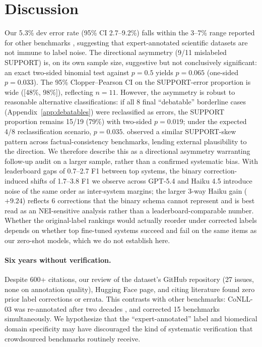 \documentclass[11pt]{article}
\begin{document}
\section{Discussion}

Our 5.3\% dev error rate (95\% CI 2.7--9.2\%) falls within the 3--7\% range reported for other benchmarks \citep{northcutt2021pervasive,rucker2023cleanconll,vendrow2025platinum}, suggesting that expert-annotated scientific datasets are not immune to label noise.
The directional asymmetry (9/11 mislabeled SUPPORT) is, on its own sample size, suggestive but not conclusively significant: an exact two-sided binomial test against $p{=}0.5$ yields $p{=}0.065$ (one-sided $p{=}0.033$).
The 95\% Clopper--Pearson CI on the SUPPORT-error proportion is wide ([48\%, 98\%]), reflecting $n{=}11$.
However, the asymmetry is robust to reasonable alternative classifications: if all 8 final ``debatable'' borderline cases (Appendix~\ref{app:debatables}) were reclassified as errors, the SUPPORT proportion remains 15/19 (79\%) with two-sided $p{=}0.019$; under the expected 4/8 reclassification scenario, $p{=}0.035$.
\citet{nahum2025llms} observed a similar SUPPORT-skew pattern across factual-consistency benchmarks, lending external plausibility to the direction.
We therefore describe this as a directional asymmetry warranting follow-up audit on a larger sample, rather than a confirmed systematic bias.
With leaderboard gaps of 0.7--2.7 F1 between top systems, the binary correction-induced shifts of 1.7--3.8 F1 we observe across GPT-5.4 and Haiku 4.5 introduce noise of the same order as inter-system margins; the larger 3-way Haiku gain ($+9.24$) reflects 6 corrections that the binary schema cannot represent and is best read as an NEI-sensitive analysis rather than a leaderboard-comparable number.
Whether the original-label rankings would actually reorder under corrected labels depends on whether top fine-tuned systems succeed and fail on the same items as our zero-shot models, which we do not establish here.

\paragraph{Six years without verification.}
Despite 600+ citations, our review of the dataset's GitHub repository (27 issues, none on annotation quality), Hugging Face page, and citing literature found zero prior label corrections or errata.
This contrasts with other benchmarks: CoNLL-03 was re-annotated after two decades \citep{rucker2023cleanconll}, and \citet{vendrow2025platinum} corrected 15 benchmarks simultaneously.
We hypothesize that the ``expert-annotated'' label and biomedical domain specificity may have discouraged the kind of systematic verification that crowdsourced benchmarks routinely receive.
\end{document}
